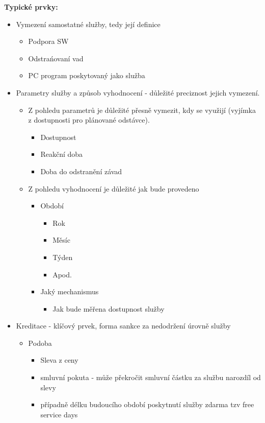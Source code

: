 \vspace{0.5cm} 
\noindent\textbf{Typické prvky:}
\begin{itemize}[noitemsep]
    \item Vymezení samostatné služby, tedy její definice
    \begin{itemize}[noitemsep]
        \item Podpora SW
        \item Odstrańovaní vad
        \item PC program poskytovaný jako služba
    \end{itemize}
    \item Parametry služby a způsob vyhodnocení - důležité preciznost jejich vymezení.
    \begin{itemize}[noitemsep]
        \item Z pohledu parametrů je důležité přesně vymezit, kdy se využijí (vyjímka z dostupnosti pro plánované odstávce).
        \begin{itemize}[noitemsep]
            \item Dostupnost
            \item Reakční doba
            \item Doba do odstranění závad
        \end{itemize}
        \item  Z pohledu vyhodnocení je důležité jak bude provedeno
        \begin{itemize}[noitemsep]
            \item Období
            \begin{itemize}[noitemsep]
                \item Rok
                \item Měsíc
                \item Týden
                \item Apod.
            \end{itemize}
            \item Jaký mechanismus
            \begin{itemize}[noitemsep]
                \item Jak bude měřena dostupnost služby
            \end{itemize}
        \end{itemize}
    \end{itemize}
    \item Kreditace - klíčový prvek, forma sankce za nedodržení úrovně služby
    \begin{itemize}[noitemsep]
        \item Podoba
        \begin{itemize}[noitemsep]
            \item  Sleva z ceny
            \item smluvní pokuta - může překročit smluvní částku za službu narozdíl od slevy
            \item případně délku budoucího období poskytnutí služby zdarma tzv free service days
        \end{itemize}
    \end{itemize}
\end{itemize}


